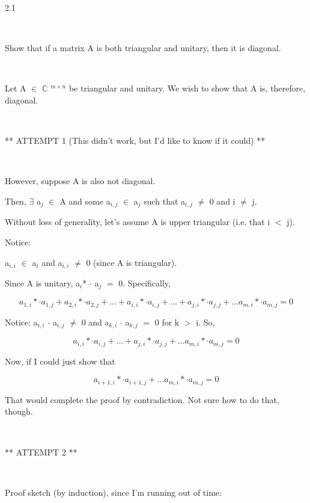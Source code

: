 \documentclass[12pt]{article}
\newcommand{\mt}[1]{\ensuremath{#1}}
\newcommand{\bc}{\mt{\mathbb{C}} }       %
\newcommand{\mem}{\mt{\in} }
\newcommand{\exs}{\mt{\exists} }
\newcommand{\ls}{\mt{<} }
\newcommand{\gr}{\mt{>} }
\newcommand{\eql}{\mt{=} }
\newcommand{\uw}[2]{#1\mt{_{#2}}}
\newcommand{\uf}[2]{#1\mt{^{#2}}}
\begin{document}
2.1

\

Show that if a matrix A is both triangular and unitary, then it is diagonal.

\

Let A \mem \uf{\bc}{m \times n} be triangular and unitary. We wish to show that A is, therefore, diagonal.

\

** ATTEMPT 1 (This didn't work, but I'd like to know if it could) **

\

However, suppose A is also not diagonal.

Then, \exs \uw{a}{j} \mem A and some \uw{a}{i, j} \mem \uw{a}{j} such that \uw{a}{i, j} $\neq$ 0 and i $\neq$ j.

Without loss of generality, let's assume A is upper triangular (i.e. that i \ls j).

Notice: 

\uw{a}{i, i} \mem \uw{a}{i} and \uw{a}{i, i} $\neq$ 0 (since A is triangular).

Since A is unitary, \uw{a}{i}* $\cdot$ \uw{a}{j} \eql 0. Specifically,

\begin{displaymath}
  a_{1, i}* \cdot a_{1, j} + a_{2, i}* \cdot a_{2, j} + ... + a_{i, i}* \cdot a_{i, j} + ... + a_{j, i}* \cdot a_{j, j} +  ... a_{m, i}* \cdot a_{m, j} \eql 0
\end{displaymath}

Notice: \uw{a}{i, i} $\cdot$ \uw{a}{i, j} $\neq$ 0 and \uw{a}{k, i} $\cdot$ \uw{a}{k, j} \eql 0 for k \gr i. So,

\begin{displaymath}
  a_{i, i}* \cdot a_{i, j} + ... + a_{j, i}* \cdot a_{j, j} +  ... a_{m, i}* \cdot a_{m, j} \eql 0
\end{displaymath}

Now, if I could just show that 

\begin{displaymath}
  a_{i + 1, i}* \cdot a_{i + 1, j} +  ... a_{m, i}* \cdot a_{m, j} \eql 0
\end{displaymath}

That would complete the proof by contradiction. Not sure how to do that, though.

\

** ATTEMPT 2 **

\

Proof sketch (by induction), since I'm running out of time:
\end{document}
